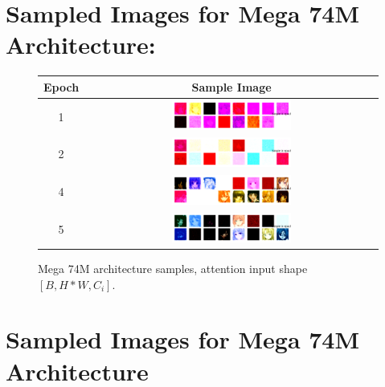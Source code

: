 \documentclass[twocolumn,superscriptaddress,aps]{revtex4-1}
\begin{document}
\section{Sampled Images for Mega 74M Architecture:}
\begin{figure}[H]
\centering
\begin{tabular}{c|c}
Epoch & Sample Image \\
\hline
1 & \includegraphics[width=0.42\textwidth]{figures/mega_unet_ddpm_74M_ckpt_epoch_1_epoch_1_samples.png} \\
2 & \includegraphics[width=0.42\textwidth]{figures/mega_unet_ddpm_74M_ckpt_epoch_2_epoch_2_samples.png} \\
4 & \includegraphics[width=0.42\textwidth]{figures/mega_unet_ddpm_74M_ckpt_epoch_4_epoch_4_samples.png} \\
5 & \includegraphics[width=0.42\textwidth]{figures/mega_unet_ddpm_74M_ckpt_epoch_5_epoch_5_samples.png} \\
\end{tabular}
\caption{Mega 74M architecture samples, attention input shape $[B, H*W, C_i]$.}
\label{tab:mega_74m}
\end{figure}

\section{Sampled Images for Mega 74M Architecture}
\end{document}
